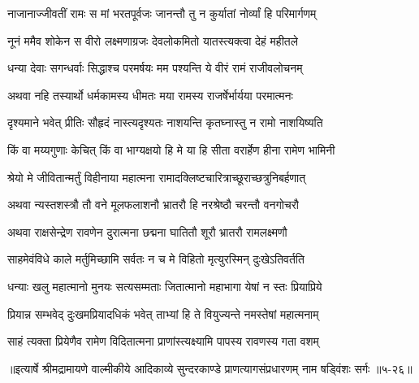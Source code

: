 \twolineshloka
{नाजानाज्जीवतीं रामः स मां भरतपूर्वजः}
{जानन्तौ तु न कुर्यातां नोर्व्यां हि परिमार्गणम्} %

\twolineshloka
{नूनं ममैव शोकेन स वीरो लक्ष्मणाग्रजः}
{देवलोकमितो यातस्त्यक्त्वा देहं महीतले} %

\twolineshloka
{धन्या देवाः सगन्धर्वाः सिद्धाश्च परमर्षयः}
{मम पश्यन्ति ये वीरं रामं राजीवलोचनम्} %

\twolineshloka
{अथवा नहि तस्यार्थो धर्मकामस्य धीमतः}
{मया रामस्य राजर्षेर्भार्यया परमात्मनः} %

\twolineshloka
{दृश्यमाने भवेत् प्रीतिः सौहृदं नास्त्यदृश्यतः}
{नाशयन्ति कृतघ्नास्तु न रामो नाशयिष्यति} %

\twolineshloka
{किं वा मय्यगुणाः केचित् किं वा भाग्यक्षयो हि मे}
{या हि सीता वरार्हेण हीना रामेण भामिनी} %

\twolineshloka
{श्रेयो मे जीवितान्मर्तुं विहीनाया महात्मना}
{रामादक्लिष्टचारित्राच्छूराच्छत्रुनिबर्हणात्} %

\twolineshloka
{अथवा न्यस्तशस्त्रौ तौ वने मूलफलाशनौ}
{भ्रातरौ हि नरश्रेष्ठौ चरन्तौ वनगोचरौ} %

\twolineshloka
{अथवा राक्षसेन्द्रेण रावणेन दुरात्मना}
{छद्मना घातितौ शूरौ भ्रातरौ रामलक्ष्मणौ} %

\twolineshloka
{साहमेवंविधे काले मर्तुमिच्छामि सर्वतः}
{न च मे विहितो मृत्युरस्मिन् दुःखेऽतिवर्तति} %

\twolineshloka
{धन्याः खलु महात्मानो मुनयः सत्यसम्मताः}
{जितात्मानो महाभागा येषां न स्तः प्रियाप्रिये} %

\twolineshloka
{प्रियान्न सम्भवेद् दुःखमप्रियादधिकं भवेत्}
{ताभ्यां हि ते वियुज्यन्ते नमस्तेषां महात्मनाम्} %

\twolineshloka
{साहं त्यक्ता प्रियेणैव रामेण विदितात्मना}
{प्राणांस्त्यक्ष्यामि पापस्य रावणस्य गता वशम्} %


॥इत्यार्षे श्रीमद्रामायणे वाल्मीकीये आदिकाव्ये सुन्दरकाण्डे प्राणत्यागसंप्रधारणम् नाम षड्विंशः सर्गः ॥५-२६॥

